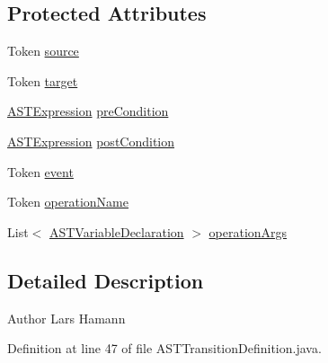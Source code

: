 \subsection*{Protected Attributes}
\begin{DoxyCompactItemize}
\item 
Token \hyperlink{classorg_1_1tzi_1_1use_1_1parser_1_1use_1_1statemachines_1_1_a_s_t_transition_definition_a756d17c4270e686d8db9c16a71b7d37c}{source}
\item 
Token \hyperlink{classorg_1_1tzi_1_1use_1_1parser_1_1use_1_1statemachines_1_1_a_s_t_transition_definition_a24e0ee5ecc1045178eaea544c570ff7f}{target}
\item 
\hyperlink{classorg_1_1tzi_1_1use_1_1parser_1_1ocl_1_1_a_s_t_expression}{A\-S\-T\-Expression} \hyperlink{classorg_1_1tzi_1_1use_1_1parser_1_1use_1_1statemachines_1_1_a_s_t_transition_definition_afc39c04decd910609aafe911fa2af217}{pre\-Condition}
\item 
\hyperlink{classorg_1_1tzi_1_1use_1_1parser_1_1ocl_1_1_a_s_t_expression}{A\-S\-T\-Expression} \hyperlink{classorg_1_1tzi_1_1use_1_1parser_1_1use_1_1statemachines_1_1_a_s_t_transition_definition_a311538d848f7a9613e8e26364bb65bf2}{post\-Condition}
\item 
Token \hyperlink{classorg_1_1tzi_1_1use_1_1parser_1_1use_1_1statemachines_1_1_a_s_t_transition_definition_a256a36587a333e89dfa47405b61a46b7}{event}
\item 
Token \hyperlink{classorg_1_1tzi_1_1use_1_1parser_1_1use_1_1statemachines_1_1_a_s_t_transition_definition_a5de7973e3771ac9b678693419c425ad7}{operation\-Name}
\item 
List$<$ \hyperlink{classorg_1_1tzi_1_1use_1_1parser_1_1ocl_1_1_a_s_t_variable_declaration}{A\-S\-T\-Variable\-Declaration} $>$ \hyperlink{classorg_1_1tzi_1_1use_1_1parser_1_1use_1_1statemachines_1_1_a_s_t_transition_definition_a638ba3f2bde228863b24f52ac7b021dd}{operation\-Args}
\end{DoxyCompactItemize}


\subsection{Detailed Description}
\begin{DoxyAuthor}{Author}
Lars Hamann 
\end{DoxyAuthor}


Definition at line 47 of file A\-S\-T\-Transition\-Definition.\-java.




